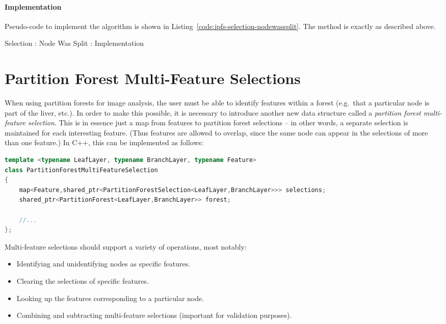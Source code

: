 \paragraph{Implementation}

Pseudo-code to implement the algorithm is shown in Listing~\ref{code:ipfs-selection-nodewassplit}. The method is exactly as described above.

\begin{stulisting}[p]
\caption{Selection : Node Was Split : Implementation}
\label{code:ipfs-selection-nodewassplit}

\end{stulisting}

\afterpage{\clearpage}
\newpage

\section{Partition Forest Multi-Feature Selections}

When using partition forests for image analysis, the user must be able to identify features within a forest (e.g.~that a particular node is part of the liver, etc.). In order to make this possible, it is necessary to introduce another new data structure called a \emph{partition forest multi-feature selection}. This is in essence just a map from features to partition forest selections -- in other words, a separate selection is maintained for each interesting feature. (Thus features are allowed to overlap, since the same node can appear in the selections of more than one feature.) In C++, this can be implemented as follows:

\begin{lstlisting}[style=Default,language=C++]
template <typename LeafLayer, typename BranchLayer, typename Feature>
class PartitionForestMultiFeatureSelection
{
	map<Feature,shared_ptr<PartitionForestSelection<LeafLayer,BranchLayer>>> selections;
	shared_ptr<PartitionForest<LeafLayer,BranchLayer>> forest;

	//...
};
\end{lstlisting}

\noindent Multi-feature selections should support a variety of operations, most notably:

\begin{itemize}
\item Identifying and unidentifying nodes as specific features.
\item Clearing the selections of specific features.
\item Looking up the features corresponding to a particular node.
\item Combining and subtracting multi-feature selections (important for validation purposes).
\end{itemize}

